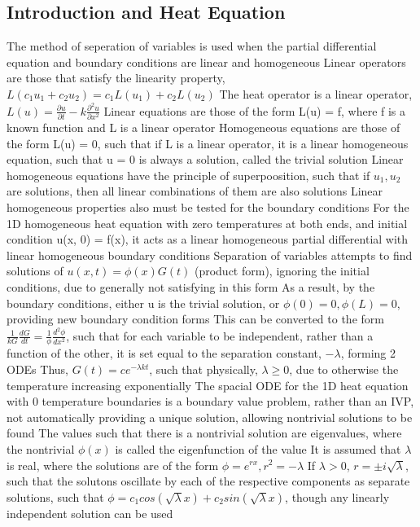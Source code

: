 \documentclass[11 pt, twoside]{article}
\newenvironment{outline*}
{
	\begin{outline}[enumerate]
	}
	{\end{outline}
}
\newcommand\pd[2]{\frac{\partial #1}{\partial #2}}
\begin{document}
\subsection{Introduction and Heat Equation}
\begin{outline*}
\1 The method of seperation of variables is used when the partial differential equation and boundary conditions are linear and homogeneous
	\2 Linear operators are those that satisfy the linearity property, $L(c_1u_1 + c_2u_2) = c_1L(u_1) + c_2L(u_2)$
		\3 The heat operator is a linear operator, $L(u) = \pd{u}{t} - k\pd{^2u}{x^2}$
		\3 Linear equations are those of the form L(u) = f, where f is a known function and L is a linear operator
	\2 Homogeneous equations are those of the form L(u) = 0, such that if L is a linear operator, it is a linear homogeneous equation, such that u = 0 is always a solution, called the trivial solution
	\2 Linear homogeneous equations have the principle of superpoosition, such that if $u_1, u_2$ are solutions, then all linear combinations of them are also solutions
		\3 Linear homogeneous properties also must be tested for the boundary conditions
\1 For the 1D homogeneous heat equation with zero temperatures at both ends, and initial condition u(x, 0) = f(x), it acts as a linear homogeneous partial differential with linear homogeneous boundary conditions
	\2 Separation of variables attempts to find solutions of $u(x, t) = \phi(x)G(t)$ (product form), ignoring the initial conditions, due to generally not satisfying in this form
		\3 As a result, by the boundary conditions, either u is the trivial solution, or $\phi(0) = 0, \phi(L) = 0$, providing new boundary condition forms
	\2 This can be converted to the form $\frac{1}{kG}\frac{dG}{dt} = \frac{1}{\phi}\frac{d^2\phi}{dx^2}$, such that for each variable to be independent, rather than a function of the other, it is set equal to the separation constant, $-\lambda$, forming 2 ODEs
		\3 Thus, $G(t) = ce^{-\lambda kt}$, such that physically, $\lambda \geq 0$, due to otherwise the temperature increasing exponentially
\1 The spacial ODE for the 1D heat equation with 0 temperature boundaries is a boundary value problem, rather than an IVP, not automatically providing a unique solution, allowing nontrivial solutions to be found
	\2 The values such that there is a nontrivial solution are eigenvalues, where the nontrivial $\phi(x)$ is called the eigenfunction of the value
	\2 It is assumed that $\lambda$ is real, where the solutions are of the form $\phi = e^{rx}, r^2 = -\lambda$
		\3 If $\lambda > 0$, $r = \pm i\sqrt{\lambda}$, such that the solutons oscillate by each of the respective components as separate solutions, such that $\phi = c_1 cos(\sqrt{\lambda} x) + c_2 sin(\sqrt{\lambda} x)$, though any linearly independent solution can be used

\end{outline*}
\end{document}
